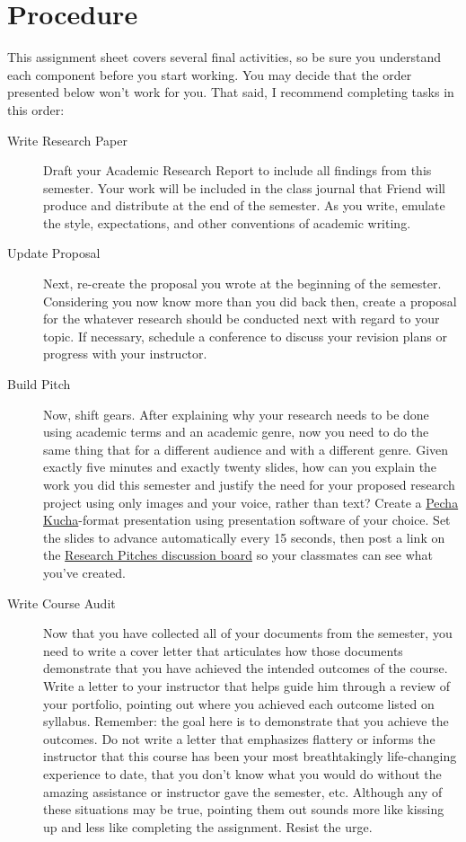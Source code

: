 \documentclass[11pt,oneside]{amsart}	%
\begin{document}
\section{Procedure} %
	\label{sec:procedure}
This assignment sheet covers several final activities, so be sure you understand each component before you start working. You may decide that the order presented below won't work for you. That said, I recommend completing tasks in this order:
\begin{description}
	\item[Write Research Paper] Draft your Academic Research Report to include all findings from this semester. Your work will be included in the class journal that Friend will produce and distribute at the end of the semester. As you write, emulate the style, expectations, and other conventions of academic writing.
	\item[Update Proposal] Next, re-create the proposal you wrote at the beginning of the semester. Considering you now know more than you did back then, create a proposal for the whatever research should be conducted next with regard to your topic. If necessary, schedule a conference to discuss your revision plans or progress with your instructor.
	\item[Build Pitch] Now, shift gears. After explaining why your research needs to be done using academic terms and an academic genre, now you need to do the same thing that for a different audience and with a different genre. Given exactly five minutes and exactly twenty slides, how can you explain the work you did this semester and justify the need for your proposed research project using only images and your voice, rather than text? Create a \href{http://www.pechakucha.org/}{Pecha Kucha}-format presentation using presentation software of your choice. Set the slides to advance automatically every 15 seconds, then post a link on the \href{https://webcourses2c.instructure.com/courses/985581/discussion_topics/1918132}{Research Pitches discussion board} so your classmates can see what you've created.
	\item[Write Course Audit] Now that you have collected all of your documents from the semester, you need to write a cover letter that articulates how those documents demonstrate that you have achieved the intended outcomes of the course. Write a letter to your instructor that helps guide him through a review of your portfolio, pointing out where you achieved each outcome listed on syllabus. Remember: the goal here is to demonstrate that you achieve the outcomes. Do not write a letter that emphasizes flattery or informs the instructor that this course has been your most breathtakingly life-changing experience to date, that you don't know what you would do without the amazing assistance or instructor gave the semester, etc. Although any of these situations may be true, pointing them out sounds more like kissing up and less like completing the assignment. Resist the urge.

\end{description}
\end{document}
